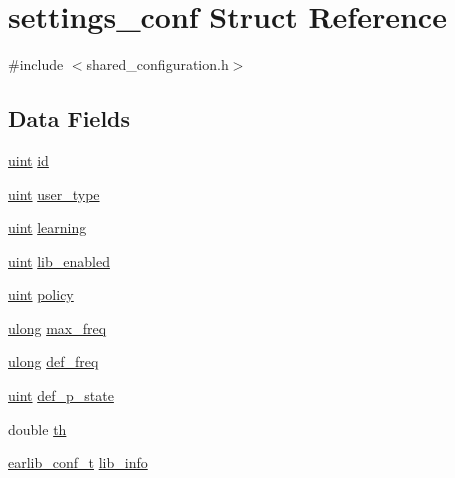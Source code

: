 \hypertarget{structsettings__conf}{}\section{settings\+\_\+conf Struct Reference}
\label{structsettings__conf}


{\ttfamily \#include $<$shared\+\_\+configuration.\+h$>$}

\subsection*{Data Fields}
\begin{DoxyCompactItemize}
\item 
\hyperlink{generic_8h_a91ad9478d81a7aaf2593e8d9c3d06a14}{uint} \hyperlink{structsettings__conf_a522c679f93025ba5df611383eed1f697}{id}
\item 
\hyperlink{generic_8h_a91ad9478d81a7aaf2593e8d9c3d06a14}{uint} \hyperlink{structsettings__conf_ad39ce3075370b3bd832e5479ac1c272b}{user\+\_\+type}
\item 
\hyperlink{generic_8h_a91ad9478d81a7aaf2593e8d9c3d06a14}{uint} \hyperlink{structsettings__conf_a4cf3cccd621fd29499ebe26ccae7295d}{learning}
\item 
\hyperlink{generic_8h_a91ad9478d81a7aaf2593e8d9c3d06a14}{uint} \hyperlink{structsettings__conf_ac31ac658c0b144ec0557f78dface9727}{lib\+\_\+enabled}
\item 
\hyperlink{generic_8h_a91ad9478d81a7aaf2593e8d9c3d06a14}{uint} \hyperlink{structsettings__conf_a36ad1b22fd075eea901a9376679c18d5}{policy}
\item 
\hyperlink{generic_8h_a718b4eb2652c286f4d42dc18a8e71a1a}{ulong} \hyperlink{structsettings__conf_a710e793245803448b27b16077a0745c5}{max\+\_\+freq}
\item 
\hyperlink{generic_8h_a718b4eb2652c286f4d42dc18a8e71a1a}{ulong} \hyperlink{structsettings__conf_a8ad3b36e7d353a391a8b6f08aec53dff}{def\+\_\+freq}
\item 
\hyperlink{generic_8h_a91ad9478d81a7aaf2593e8d9c3d06a14}{uint} \hyperlink{structsettings__conf_aad942b4394e08d446f8488296bafdb09}{def\+\_\+p\+\_\+state}
\item 
double \hyperlink{structsettings__conf_aba750ba55d6f8c2511f39864719d6781}{th}
\item 
\hyperlink{cluster__conf_8h_ab77e2db67e3090de8bc90b4b3d971b62}{earlib\+\_\+conf\+\_\+t} \hyperlink{structsettings__conf_ae31a99c1d9fd4ee623da7db1ef6b1bfd}{lib\+\_\+info}
\end{DoxyCompactItemize}


